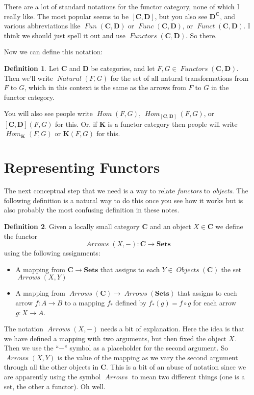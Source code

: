 \documentclass[12pt]{article}
\theoremstyle{definition}
\theoremstyle{definition}
\newtheorem{defn}{Definition}[]
\theoremstyle{definition}
\numberwithin{equation}{section}
\newcommand{\cat}[1]{\mathbf{#1}}      %
\newcommand{\fcat}[1]{{\mathbf {#1}}}    %
\newcommand{\CC}{\cat{C}}
\newcommand{\DD}{\cat{D}}
\DeclareMathOperator{\Arrows}{\mathit{Arrows}}
\DeclareMathOperator{\Objects}{\mathit{Objects}}
\DeclareMathOperator{\Hom}{\mathit{Hom}}
\DeclareMathOperator{\Nat}{\mathit{Natural}}
\DeclareMathOperator{\Fun}{\mathit{Functors}}
\newcommand{\Set}{\fcat{Sets}}           %
\def\ni{\goodbreak\noindent}
\begin{document}
There are a lot of standard notations for the functor category, none of which I really
like. The most popular seems to be $[\CC, \DD]$, but you also see $\DD^{\CC}$, and various
abbreviations like $\mathop{\mathit{Fun}}(\CC,\DD)$ or $\mathop{\mathit{Func}}(\CC,\DD)$,
or $\mathop{\mathit{Funct}}(\CC,\DD)$. I think we should just spell it out and use
$\Fun(\CC,\DD)$. So there.

Now we can define this notation:

\begin{defn}
Let $\CC$ and $\DD$ be categories, and let $F, G \in \Fun(\CC, \DD)$. Then we'll write
$\Nat(F, G)$ for the set of all natural transformations from $F$ to $G$, which in this
context is the same as the arrows from $F$ to $G$ in the functor category.
\end{defn}
\ni
You will also see people write $\Hom(F, G)$, $\Hom_{[\CC,\DD]}(F,G)$, or 
$[\CC,\DD](F,G)$ for this. Or, if $\cat{K}$ is a functor category then 
people will write $\Hom_{\cat{K}}(F,G)$ or
$\cat{K}(F,G)$ for this.

\section{Representing Functors}

The next conceptual step that we need is a way to relate {\it functors} to {\it objects}.
The following definition is a natural way to do this once you see how it works but is also
probably the most confusing definition in these notes.

\begin{defn}
Given a locally small category $\CC$ and an object $X \in \CC$ we define the functor
$$
\Arrows(X,-) : \CC \to \Set
$$
using the following assignments:
\begin{itemize}
\item A mapping from $\CC \to \Set$ that assigns to each $Y \in \Objects(\CC)$ the set
$\Arrows(X,Y)$
\item A mapping from $\Arrows(\CC) \to \Arrows(\Set) $ that assigns to each arrow $f: A
\to B$ to a mapping $f_*$ defined by $f_*(g) = f\circ g$ for each arrow $g: X \to A$.
\end{itemize}
\end{defn}
\ni
The notation $\Arrows(X,-)$ needs a bit of explanation. Here the idea is that we have
defined a mapping with two arguments, but then fixed the object $X$. Then we use the
``$-$'' symbol as a placeholder for the second argument. So $\Arrows(X,Y)$ is the value of
the mapping as we vary the second argument through all the other objects in $\CC$. This is
a bit of an abuse of notation since we are apparently using the symbol $\Arrows$ to mean
two different things (one is a set, the other a functor). Oh well.
\end{document}
